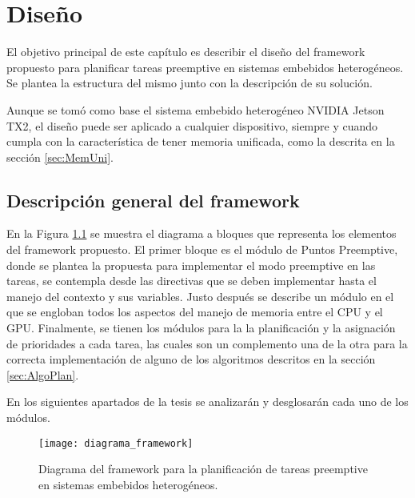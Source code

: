 

\chapter{Diseño}\label{cha:Diseño}

El objetivo principal de este capítulo es describir el diseño del framework propuesto para planificar tareas preemptive en sistemas embebidos heterogéneos. Se plantea la estructura del mismo junto con la descripción de su solución. 

Aunque se tomó como base el sistema embebido heterogéneo NVIDIA Jetson TX2, el diseño puede ser aplicado a cualquier dispositivo, siempre y cuando cumpla con la característica de tener memoria unificada, como la descrita en la sección \ref{sec:MemUni}.

\section{Descripción general del framework}

En la Figura \ref{fig:diagramabase} se muestra el diagrama a bloques que representa los elementos del framework propuesto. El primer bloque es el módulo de Puntos Preemptive, donde se plantea la propuesta para implementar el modo preemptive en las tareas, se contempla desde las directivas que se deben implementar hasta el manejo del contexto y sus variables. Justo después se describe un módulo en el que se engloban todos los aspectos del manejo de memoria entre el CPU y el GPU. Finalmente, se tienen los módulos para la la planificación y la asignación de prioridades a cada tarea, las cuales son un complemento una de la otra para la correcta implementación de alguno de los algoritmos descritos en la sección \ref{sec:AlgoPlan}.
\newline

En los siguientes apartados de la tesis se analizarán y desglosarán cada uno de los módulos.
\newline 
 
  \begin{figure}[ht]
        \texttt{[image: diagrama\_framework]}
        \caption{Diagrama del framework para la planificación de tareas preemptive en sistemas embebidos heterogéneos.}
        \label{fig:diagramabase}
    \end{figure}
  

